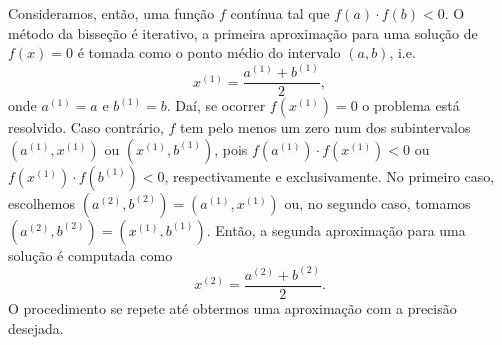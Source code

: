 Consideramos, então, uma função $f$ contínua tal que $f(a)\cdot f(b) < 0$. O método da bisseção é iterativo, a primeira aproximação para uma solução de $f(x)=0$ é tomada como o ponto médio do intervalo $(a, b)$, i.e.
\begin{equation}
  x^{(1)} = \frac{a^{(1)}+b^{(1)}}{2},
\end{equation}
onde $a^{(1)} = a$ e $b^{(1)} = b$. Daí, se ocorrer $f(x^{(1)})=0$ o problema está resolvido. Caso contrário, $f$ tem pelo menos um zero num dos subintervalos $(a^{(1)}, x^{(1)})$ ou $(x^{(1)}, b^{(1)})$, pois $f(a^{(1)})\cdot f(x^{(1)}) < 0$ ou  $f(x^{(1)})\cdot f(b^{(1)}) < 0$, respectivamente e exclusivamente. No primeiro caso, escolhemos $(a^{(2)}, b^{(2)}) = (a^{(1)}, x^{(1)})$ ou, no segundo caso, tomamos $(a^{(2)}, b^{(2)}) = (x^{(1)}, b^{(1)})$. Então, a segunda aproximação para uma solução é computada como
\begin{equation}
  x^{(2)} = \frac{a^{(2)} + b^{(2)}}{2}.
\end{equation}
O procedimento se repete até obtermos uma aproximação com a precisão desejada.

